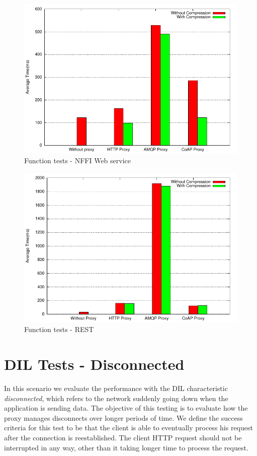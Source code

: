 \begin{figure}[H]
\center
\includegraphics[scale=0.75]{../results/function_tests/nffi/result.pdf}
\caption{Function tests - NFFI Web service}
\end{figure}

\begin{figure}[H]
\center
\includegraphics[scale=0.75]{../results/function_tests/rest/result.pdf}
\caption{Function tests - REST}
\end{figure}


\section{DIL Tests - Disconnected}

In this scenario we evaluate  the performance with the DIL characteristic
\textit{disconnected}, which refers to the network suddenly going down when the
application is sending data. The objective of this testing is to evaluate how
the proxy manages disconnects over longer periods of time. We define the success
criteria for this test to be that the client is able to eventually process his
request after the connection is reestablished. The client HTTP request should
not be interrupted in any way, other than it taking longer time to process the
request.

